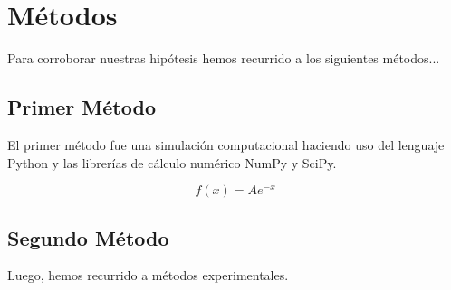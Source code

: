 \chapter{Métodos}

Para corroborar nuestras hipótesis hemos recurrido a los siguientes métodos...


\section{Primer Método}

El primer método fue una simulación computacional haciendo uso del lenguaje Python y las librerías de cálculo numérico NumPy y SciPy.

\begin{equation}
f(x) = A e^{-x}
\label{eq:funcion}
\end{equation}

\section{Segundo Método}

Luego, hemos recurrido a métodos experimentales.


